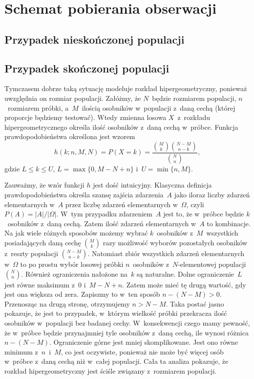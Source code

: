 \chapter{Schemat pobierania obserwacji}

\section{Przypadek nieskończonej populacji}

\section{Przypadek skończonej populacji}

Tymczasem dobrze taką sytuację modeluje rozkład hipergeometryczny, ponieważ uwzględnia on rozmiar populacji. Załóżmy, że $N$~będzie rozmiarem populacji, $n$~rozmiarem próbki, a~$M$~ilością osobników w~populacji z~daną cechą (której proporcje będziemy testować). Wtedy zmienna losowa $X$~z~rozkładu hipergeometrycznego określa ilość osobników z~daną cechą w~próbce. Funkcja prawdopodobieństwa określona jest wzorem
\begin{equation}
h(k;n,M,N) = P(X=k) = \frac{\binom{M}{k} \binom{N-M}{n-k}}{\binom{N}{n}},
\end{equation}
gdzie $L\leq k\leq U$, $L=\max\{0,M-N+n\}$ i~$U=\min\{n,M\}$.

Zauważmy, że wzór funkcji $h$ jest dość intuicyjny. Klasyczna definicja prawdopodobieństwa określa szansę zajścia zdarzenia~$A$ jako iloraz liczby zdarzeń elementarnych w~$A$ przez liczbę zdarzeń elementarnych w~$\Omega$, czyli $P(A) = |A|/|\Omega|$. W~tym przypadku zdarzeniem~$A$ jest to, że w~próbce będzie $k$~osobników z~daną cechą. Zatem ilość zdarzeń elementarnych w~$A$ to kombinacje. Na jak wiele różnych sposobów możemy wybrać $k$~osobników z~$M$~wszystkich posiadających daną cechę $\binom{M}{k}$ razy możliwość wyborów pozostałych osobników z~reszty populacji $\binom{N-M}{n-k}$. Natomiast zbiór wszystkich zdarzeń elementarnych w~$\Omega$ to po prostu wybór losowej próbki $n$~osobników z~$N$-elementowej populacji $\binom{N}{n}$. Również ograniczenia nałożone na~$k$ są naturalne. Dolne ograniczenie~$L$ jest równe maksimum z~$0$ i~$M-N+n$. Zatem może mieć tę drugą wartość, gdy jest ona większa od zera. Zapiszmy to w~ten sposób $n-(N-M)>0$. Przenosząc na drugą stronę, otrzymujemy $n>N-M$. Taka postać jasno pokazuje, że jest to przypadek, w~którym wielkość próbki przekracza ilość osobników w~populacji bez badanej cechy. W~konsekwencji czego mamy pewność, że w~próbce będzie przynajmniej tyle osobników z~daną cechą, ile wynosi różnica $n-(N-M)$. Ograniczenie górne jest mniej skomplikowane. Jest ono równe minimum z~$n$~i~$M$, co jest oczywiste, ponieważ nie może być więcej osób w~próbce z~daną cechą niż w~całej populacji. Cała ta analiza pokazuje, że rozkład hipergeometryczny jest ściśle związany z~rozmiarem populacji.

